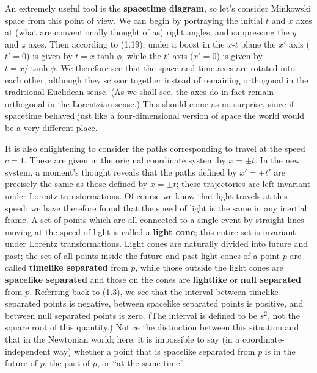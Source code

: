 An extremely useful tool is the {\bf spacetime diagram}, so let's 
consider Minkowski space from this point of view.  We can begin by
portraying the initial $t$ and $x$ axes at (what are conventionally
thought of as) right angles, and suppressing the $y$ and $z$ axes.
Then according to (1.19), under a boost in the $x$-$t$ plane 
the $x'$ axis ($t' = 0$) is given by
$t = x \tanh\phi$, while the $t'$ axis ($x' = 0$) is given by
$t = x/\tanh\phi$.  We therefore see that the space and time axes
are rotated into each other, although they scissor
together instead of remaining orthogonal in the traditional Euclidean
sense.  (As we shall see, the axes do in fact remain orthogonal
in the Lorentzian sense.)
This should come as no surprise, since if spacetime behaved
just like a four-dimensional version of space the world would be a 
very different place.

\begin{figure}
  \centerline{
  }
\end{figure}

It is also enlightening to consider the paths corresponding to travel
at the speed $c=1$.  These are given in the original coordinate system
by $x=\pm t$.  In the new system, a moment's thought reveals that the
paths defined by $x' = \pm t'$ are precisely the same as those defined
by $x=\pm t$; these trajectories are left invariant under Lorentz
transformations.  Of course we know that light travels at this speed;
we have therefore found that the speed of light is the same in any
inertial frame.  A set of points which are all connected to a single
event by straight lines moving at the speed of light is called a 
{\bf light cone}; this entire set is invariant under Lorentz
transformations.  Light cones are naturally divided into future
and past; the set of all points inside the future and past light
cones of a point $p$ are called {\bf timelike separated} from $p$,
while those outside the light cones are {\bf spacelike separated}
and those on the cones are {\bf lightlike} or {\bf null separated}
from $p$.  Referring back to (1.3), we see that the interval between
timelike separated points is negative, between spacelike separated
points is positive, and between null separated points is zero. 
(The interval is defined to be $s^2$, not the square root of this
quantity.)  Notice the distinction between this situation and that
in the Newtonian world; here, it is impossible to say (in a 
coordinate-independent way) whether a point that is spacelike separated
from $p$ is in the future of $p$, the past of $p$, or ``at the same 
time''.

